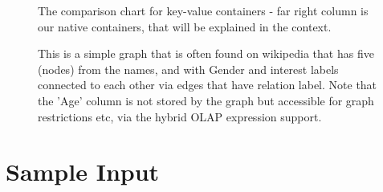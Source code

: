 \documentclass[preprint,3p,twocolumn]{elsarticle}
\begin{document}
\begin{figure}
\centering
    \caption{The comparison chart for key-value containers - far right column is our native containers, that will be explained in the context.}
    \label{Figure:maps}
\end{figure}

\begin{figure}
\centering
    \caption{This is a simple graph that is often found on wikipedia that has five (nodes) from the names, and with Gender and interest labels connected to each other via edges that have relation label. Note that the 'Age' column is not stored by the graph but accessible for graph restrictions etc, via the hybrid OLAP expression support.}
    \label{Figure:wikigraph}
\end{figure}


\section{Sample Input}
\label{Section:SampleInput}
\end{document}
